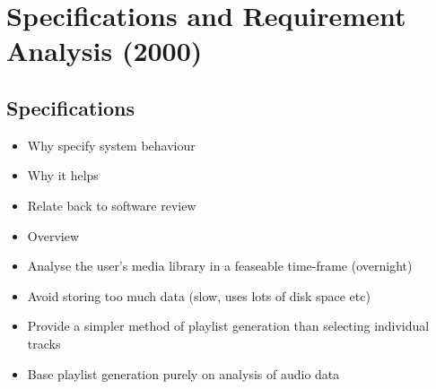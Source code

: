%
%
\chapter{Specifications and Requirement Analysis (2000)}
\section{Specifications}
\begin{itemize}
	\item Why specify system behaviour
	\item Why it helps
	\item Relate back to software review
	\item Overview
\end{itemize}
\begin{itemize}
	\item Analyse the user's media library in a feaseable time-frame (overnight)
	\item Avoid storing too much data (slow, uses lots of disk space etc)
	\item Provide a simpler method of playlist generation than selecting individual tracks
	\item Base playlist generation purely on analysis of audio data
\end{itemize}
